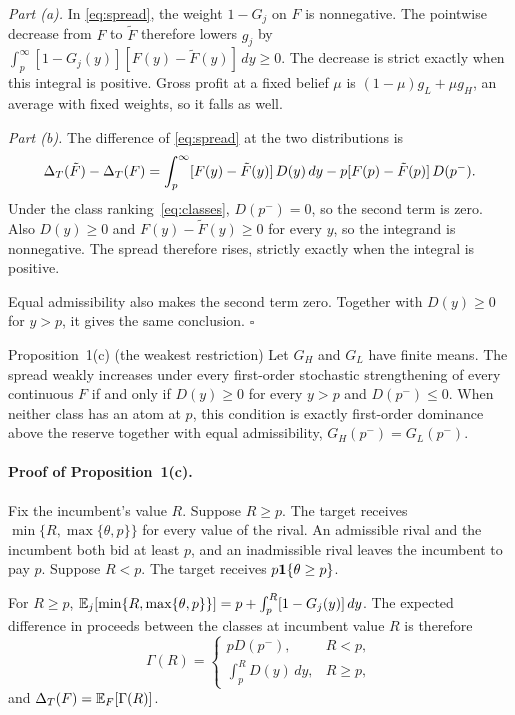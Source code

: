 \emph{Part (a).} In \eqref{eq:spread}, the weight \(1-G_j\) on \(F\) is nonnegative. The pointwise decrease
from \(F\) to \(\tilde F\) therefore lowers \(g_j\) by \(\int_p^\infty[1-G_j(y)][F(y)-\tilde F(y)]\,dy\ge0\).
The decrease is strict exactly when this integral is positive. Gross profit at a fixed belief \(\mu\) is
\((1-\mu)g_L+\mu g_H\), an average with fixed weights, so it falls as well.

\emph{Part (b).} The difference of \eqref{eq:spread} at the two distributions is
\[
\Delta_T(\tilde F)-\Delta_T(F)=\int_p^\infty[F(y)-\tilde F(y)]\,D(y)\,dy-p[F(p)-\tilde F(p)]\,D(p^-).
\]
Under the class ranking~\eqref{eq:classes}, \(D(p^-)=0\), so the second term is zero. Also \(D(y)\ge0\) and
\(F(y)-\tilde F(y)\ge0\) for every \(y\), so the integrand is nonnegative. The spread therefore rises, strictly
exactly when the integral is positive.

Equal admissibility also makes the second term zero. Together with \(D(y)\ge0\) for \(y>p\), it gives the same
conclusion. \(\square\)

\begin{named}{Proposition~1(c) (the weakest restriction)}
Let \(G_H\) and \(G_L\) have finite means. The spread weakly increases under every first-order stochastic
strengthening of every continuous \(F\) if and only if \(D(y)\ge0\) for every \(y>p\) and \(D(p^-)\le0\).
When neither class has an atom at \(p\), this condition is exactly first-order dominance above the reserve
together with equal admissibility, \(G_H(p^-)=G_L(p^-)\).
\end{named}

\paragraph{Proof of Proposition~1(c).}
Fix the incumbent's value \(R\). Suppose \(R\ge p\). The target receives \(\min\{R,\max\{\theta,p\}\}\) for every value of the rival. An admissible rival and the incumbent both bid at least \(p\), and an inadmissible
rival leaves the incumbent to pay \(p\). Suppose \(R<p\). The target receives \(p\mathbf{1}\{\theta\ge p\}\).

For \(R\ge p\), \(\mathbb{E}_j[\min\{R,\max\{\theta,p\}\}]=p+\int_p^R[1-G_j(y)]\,dy\). The expected difference in
proceeds between the classes at incumbent value \(R\) is therefore
\[
\Gamma(R)=
\begin{cases}
pD(p^-), & R<p,\\[3pt]
\int_p^RD(y)\,dy, & R\ge p,
\end{cases}
\]
and \(\Delta_T(F)=\mathbb{E}_F[\Gamma(R)]\).


